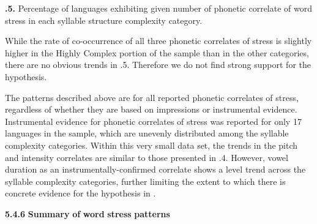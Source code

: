 \textbf{.5.} Percentage of languages exhibiting given number of phonetic correlate of word stress in each syllable structure complexity category.

  While the rate of co-occurrence of all three phonetic correlates of stress is slightly higher in the Highly Complex portion of the sample than in the other categories, there are no obvious trends in .5. Therefore we do not find strong support for the hypothesis.

  The patterns described above are for all reported phonetic correlates of stress, regardless of whether they are based on impressions or instrumental evidence. Instrumental evidence for phonetic correlates of stress was reported for only 17 languages in the sample, which are unevenly distributed among the syllable complexity categories. Within this very small data set, the trends in the pitch and intensity correlates are similar to those presented in .4. However, vowel duration as an instrumentally-confirmed correlate shows a level trend across the syllable complexity categories, further limiting the extent to which there is concrete evidence for the hypothesis in .

\textbf{5.4.6} \textbf{Summary} \textbf{of} \textbf{word} \textbf{stress} \textbf{patterns}

